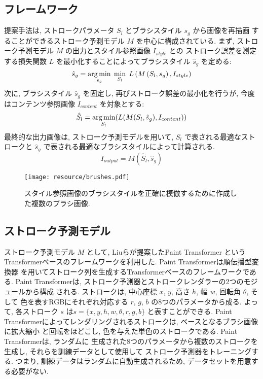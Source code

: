 \documentclass[MIRU,submit,uplatex]{miru2023j}
\begin{document}
\subsection{フレームワーク}
提案手法は, ストロークパラメータ $S_l$ とブラシスタイル $s_g$ から画像を再描画
することができるストローク予測モデル $M$ を中心に構成されている. 
まず, ストローク予測モデル $M$ の出力とスタイル参照画像 $I_{style}$ との
ストローク誤差を測定する損失関数 $L$ を最小化することによってブラシスタイル
$\hat{s}_g$ を定める: 
\begin{equation}
    \hat{s}_g = \operatorname*{arg\,min}_{s_g} \;
        \min_{S_l} \;
           L\left( M\left(S_l, s_g\right), I_{style}\right)
    \label{eq_first}
\end{equation}
次に, ブラシスタイル $\hat{s}_g$ を固定し, 再びストローク誤差の最小化を行うが,
今度はコンテンツ参照画像 $I_{content}$ を対象とする: 
\begin{equation}
    \hat{S}_l = \operatorname*{arg\,min}_{S_l} (L(M(S_l, \hat{s}_g), I_{content}))
    \label{eq_second}
\end{equation}
最終的な出力画像は, ストローク予測モデルを用いて, $S_l$ で表される最適なストロークと
$\hat{s}_g$ で表される最適なブラシスタイルによって計算される.
\begin{equation}
    I_{output} = M( \hat{S}_l, \hat{s}_g )
\end{equation}

\begin{figure}
    \centering
    \texttt{[image: resource/brushes.pdf]}
    \caption{スタイル参照画像のブラシスタイルを正確に模倣するために作成した複数のブラシ画像.}
    \label{fig:brushes}
\end{figure}
 
\subsection{ストローク予測モデル}
ストローク予測モデル $M$ として, Liuら\cite{PaintTransformer}が提案したPaint Transformer
というTransformerベースのフレームワークを利用した. Paint Transformerは順伝播型変換器
を用いてストローク列を生成するTransformerベースのフレームワークである.
Paint Transformerは, ストローク予測器とストロークレンダラーの2つのモジュールから構成
される. ストロークは, 中心座標 $x$, $y$, 高さ $h$, 幅 $w$, 回転角 $\theta$, そして
色を表すRGBにそれぞれ対応する $r$, $g$, $b$ の8つのパラメータから成る. 
よって, 各ストローク $s$ は$s = \{ x, y, h, w, \theta, r, g, b \}$ と表すことができる.
Paint Transformerによってレンダリングされるストロークは, ベースとなるブラシ画像に拡大縮小
と回転をほどこし, 色を与えた単色のストロークである. Paint Transformerは, ランダムに
生成された8つのパラメータから複数のストロークを生成し, それらを訓練データとして使用して
ストローク予測器をトレーニングする. つまり, 訓練データはランダムに自動生成されるため,
データセットを用意する必要がない.
\end{document}
